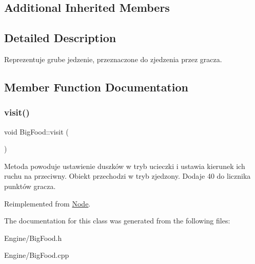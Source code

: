 \subsection*{Additional Inherited Members}


\subsection{Detailed Description}
Reprezentuje grube jedzenie, przeznaczone do zjedzenia przez gracza. 

\subsection{Member Function Documentation}
\mbox{\label{classBigFood_ac463d12e08fe29b7414520c50856b450}} 
\subsubsection{\texorpdfstring{visit()}{visit()}}
{\footnotesize\ttfamily void Big\+Food\+::visit (\begin{DoxyParamCaption}{ }\end{DoxyParamCaption})\hspace{0.3cm}{\ttfamily [virtual]}}

Metoda powoduje ustawienie duszków w tryb ucieczki i ustawia kierunek ich ruchu na przeciwny. Obiekt przechodzi w tryb \textquotesingle{}zjedzony\textquotesingle{}. Dodaje 40 do licznika punktów gracza. 

Reimplemented from \hyperlink{classNode_a7cb557af2f8c31fa43fc4c75134750e8}{Node}.



The documentation for this class was generated from the following files\+:\begin{DoxyCompactItemize}
\item 
Engine/Big\+Food.\+h\item 
Engine/Big\+Food.\+cpp\end{DoxyCompactItemize}
